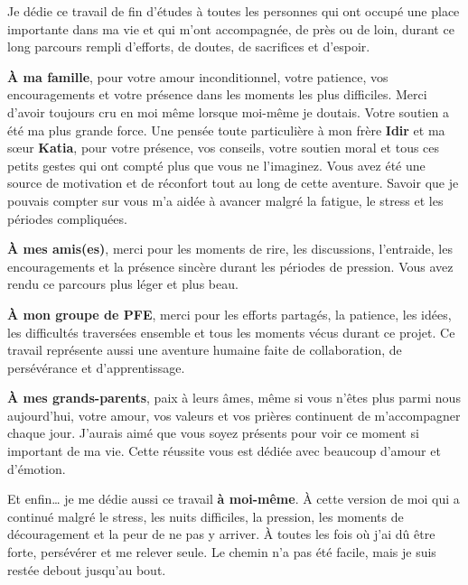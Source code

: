 \documentclass[12pt,a4paper]{report}
\begin{document}
\vspace{0.5cm}

Je dédie ce travail de fin d'études à toutes les personnes qui ont occupé une place importante dans ma vie et qui m'ont accompagnée, de près ou de loin, durant ce long parcours rempli d'efforts, de doutes, de sacrifices et d'espoir.

\vspace{0.3cm}

\textbf{À ma famille}, pour votre amour inconditionnel, votre patience, vos encouragements et votre présence dans les moments les plus difficiles. Merci d'avoir toujours cru en moi même lorsque moi-même je doutais. Votre soutien a été ma plus grande force. Une pensée toute particulière à mon frère \textbf{Idir} et ma sœur \textbf{Katia}, pour votre présence, vos conseils, votre soutien moral et tous ces petits gestes qui ont compté plus que vous ne l'imaginez. Vous avez été une source de motivation et de réconfort tout au long de cette aventure. Savoir que je pouvais compter sur vous m'a aidée à avancer malgré la fatigue, le stress et les périodes compliquées.

\vspace{0.3cm}

\textbf{À mes amis(es)}, merci pour les moments de rire, les discussions, l'entraide, les encouragements et la présence sincère durant les périodes de pression. Vous avez rendu ce parcours plus léger et plus beau.

\vspace{0.3cm}

\textbf{À mon groupe de PFE}, merci pour les efforts partagés, la patience, les idées, les difficultés traversées ensemble et tous les moments vécus durant ce projet. Ce travail représente aussi une aventure humaine faite de collaboration, de persévérance et d'apprentissage.

\vspace{0.3cm}

\textbf{À mes grands-parents}, paix à leurs âmes, même si vous n'êtes plus parmi nous aujourd'hui, votre amour, vos valeurs et vos prières continuent de m'accompagner chaque jour. J'aurais aimé que vous soyez présents pour voir ce moment si important de ma vie. Cette réussite vous est dédiée avec beaucoup d'amour et d'émotion.

\vspace{0.3cm}

Et enfin… je me dédie aussi ce travail \textbf{à moi-même}. À cette version de moi qui a continué malgré le stress, les nuits difficiles, la pression, les moments de découragement et la peur de ne pas y arriver. À toutes les fois où j'ai dû être forte, persévérer et me relever seule. Le chemin n'a pas été facile, mais je suis restée debout jusqu'au bout.
\end{document}
